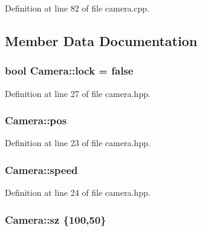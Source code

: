 Definition at line 82 of file camera.\-cpp.



\subsection{Member Data Documentation}
\hypertarget{class_camera_a0b9f6986a66a6ac5477e2beee00f0585}{
\subsubsection[{lock}]{\setlength{\rightskip}{0pt plus 5cm}bool Camera\-::lock = false\hspace{0.3cm}{\ttfamily [static]}}}\label{class_camera_a0b9f6986a66a6ac5477e2beee00f0585}


Definition at line 27 of file camera.\-hpp.

\hypertarget{class_camera_a748c4e2867e34f45a431a1d2dcc6fee2}{
\subsubsection[{pos}]{ Camera\-::pos\hspace{0.3cm}{\ttfamily [static]}}}\label{class_camera_a748c4e2867e34f45a431a1d2dcc6fee2}


Definition at line 23 of file camera.\-hpp.

\hypertarget{class_camera_aa0d0a54eb56182723dbd0ce61e0b3e8d}{
\subsubsection[{speed}]{ Camera\-::speed\hspace{0.3cm}{\ttfamily [static]}}}\label{class_camera_aa0d0a54eb56182723dbd0ce61e0b3e8d}


Definition at line 24 of file camera.\-hpp.

\hypertarget{class_camera_a778d16b26445c706637ee754054d5f36}{
\subsubsection[{sz}]{ Camera\-::sz \{100,50\}\hspace{0.3cm}{\ttfamily [static]}}}\label{class_camera_a778d16b26445c706637ee754054d5f36}



